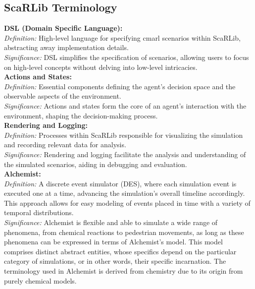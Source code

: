\documentclass[12pt,a4paper,openright,twoside]{book}
\begin{document}
\subsection{ScaRLib Terminology}

\textbf{DSL (Domain Specific Language):}\\
\textit{Definition:} High-level language for specifying \ac{cmarl} scenarios within ScaRLib, abstracting away implementation details.\\
\textit{Significance:} DSL simplifies the specification of scenarios, allowing users to focus on high-level concepts without delving into low-level intricacies.\\

\textbf{Actions and States:}\\
\textit{Definition:} Essential components defining the agent's decision space and the observable aspects of the environment.\\
\textit{Significance:} Actions and states form the core of an agent's interaction with the environment, shaping the decision-making process.\\

\textbf{Rendering and Logging:}\\
\textit{Definition:} Processes within ScaRLib responsible for visualizing the simulation and recording relevant data for analysis.\\
\textit{Significance:} Rendering and logging facilitate the analysis and understanding of the simulated scenarios, aiding in debugging and evaluation.\\

\textbf{Alchemist:}\\
\textit{Definition:} A discrete event simulator (DES), where each simulation event is executed one at a time, advancing the simulation's overall timeline accordingly. This approach allows for easy modeling of events placed in time with a variety of temporal distributions.\\
\textit{Significance:} Alchemist is flexible and able to simulate a wide range of phenomena, from chemical reactions to pedestrian movements, as long as these phenomena can be expressed in terms of Alchemist's model. This model comprises distinct abstract entities, whose specifics depend on the particular category of simulations, or in other words, their specific incarnation. The terminology used in Alchemist is derived from chemistry due to its origin from purely chemical models.\\
\end{document}
